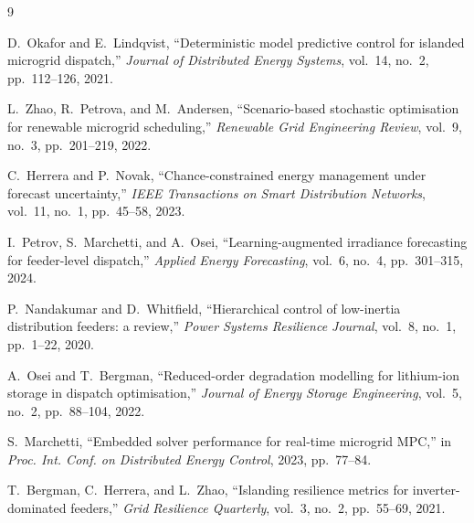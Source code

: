 \begin{thebibliography}{9}

D.~Okafor and E.~Lindqvist, ``Deterministic model predictive control for islanded microgrid dispatch,'' \emph{Journal of Distributed Energy Systems}, vol.~14, no.~2, pp.~112--126, 2021.

L.~Zhao, R.~Petrova, and M.~Andersen, ``Scenario-based stochastic optimisation for renewable microgrid scheduling,'' \emph{Renewable Grid Engineering Review}, vol.~9, no.~3, pp.~201--219, 2022.

C.~Herrera and P.~Novak, ``Chance-constrained energy management under forecast uncertainty,'' \emph{IEEE Transactions on Smart Distribution Networks}, vol.~11, no.~1, pp.~45--58, 2023.

I.~Petrov, S.~Marchetti, and A.~Osei, ``Learning-augmented irradiance forecasting for feeder-level dispatch,'' \emph{Applied Energy Forecasting}, vol.~6, no.~4, pp.~301--315, 2024.

P.~Nandakumar and D.~Whitfield, ``Hierarchical control of low-inertia distribution feeders: a review,'' \emph{Power Systems Resilience Journal}, vol.~8, no.~1, pp.~1--22, 2020.

A.~Osei and T.~Bergman, ``Reduced-order degradation modelling for lithium-ion storage in dispatch optimisation,'' \emph{Journal of Energy Storage Engineering}, vol.~5, no.~2, pp.~88--104, 2022.

S.~Marchetti, ``Embedded solver performance for real-time microgrid MPC,'' in \emph{Proc. Int. Conf. on Distributed Energy Control}, 2023, pp.~77--84.

T.~Bergman, C.~Herrera, and L.~Zhao, ``Islanding resilience metrics for inverter-dominated feeders,'' \emph{Grid Resilience Quarterly}, vol.~3, no.~2, pp.~55--69, 2021.

\end{thebibliography}
